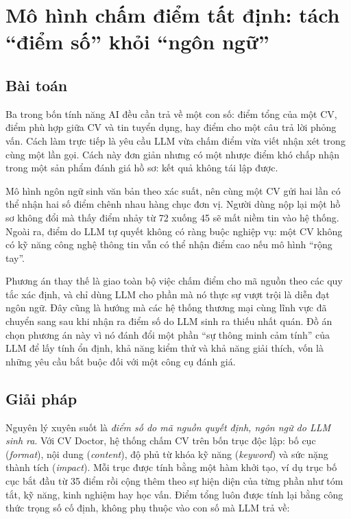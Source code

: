 \documentclass[../DoAn.tex]{subfiles}
\begin{document}
\section{Mô hình chấm điểm tất định: tách ``điểm số'' khỏi ``ngôn ngữ''}
\label{sec:ch5-heuristic-first}

\subsection{Bài toán}

Ba trong bốn tính năng AI đều cần trả về một con số: điểm tổng của một CV, điểm phù hợp giữa CV và tin tuyển dụng, hay điểm cho một câu trả lời phỏng vấn. Cách làm trực tiếp là yêu cầu LLM vừa chấm điểm vừa viết nhận xét trong cùng một lần gọi. Cách này đơn giản nhưng có một nhược điểm khó chấp nhận trong một sản phẩm đánh giá hồ sơ: kết quả không tái lập được.

Mô hình ngôn ngữ sinh văn bản theo xác suất, nên cùng một CV gửi hai lần có thể nhận hai số điểm chênh nhau hàng chục đơn vị. Người dùng nộp lại một hồ sơ không đổi mà thấy điểm nhảy từ 72 xuống 45 sẽ mất niềm tin vào hệ thống. Ngoài ra, điểm do LLM tự quyết không có ràng buộc nghiệp vụ: một CV không có kỹ năng công nghệ thông tin vẫn có thể nhận điểm cao nếu mô hình ``rộng tay''.

Phương án thay thế là giao toàn bộ việc chấm điểm cho mã nguồn theo các quy tắc xác định, và chỉ dùng LLM cho phần mà nó thực sự vượt trội là diễn đạt ngôn ngữ. Đây cũng là hướng mà các hệ thống thương mại cùng lĩnh vực đã chuyển sang sau khi nhận ra điểm số do LLM sinh ra thiếu nhất quán. Đồ án chọn phương án này vì nó đánh đổi một phần ``sự thông minh cảm tính'' của LLM để lấy tính ổn định, khả năng kiểm thử và khả năng giải thích, vốn là những yêu cầu bắt buộc đối với một công cụ đánh giá.

\subsection{Giải pháp}

Nguyên lý xuyên suốt là \emph{điểm số do mã nguồn quyết định, ngôn ngữ do LLM sinh ra}. Với CV Doctor, hệ thống chấm CV trên bốn trục độc lập: bố cục (\textit{format}), nội dung (\textit{content}), độ phủ từ khóa kỹ năng (\textit{keyword}) và sức nặng thành tích (\textit{impact}). Mỗi trục được tính bằng một hàm khởi tạo, ví dụ trục bố cục bắt đầu từ 35 điểm rồi cộng thêm theo sự hiện diện của từng phần như tóm tắt, kỹ năng, kinh nghiệm hay học vấn. Điểm tổng luôn được tính lại bằng công thức trọng số cố định, không phụ thuộc vào con số mà LLM trả về:
\end{document}
